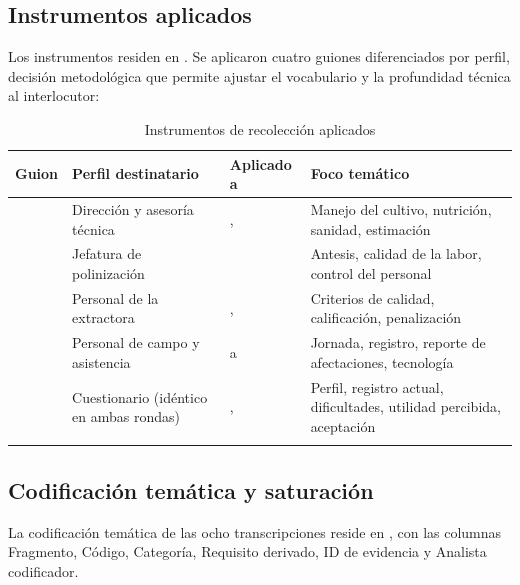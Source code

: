 \subsection{Instrumentos aplicados}

Los instrumentos residen en . Se aplicaron cuatro guiones
diferenciados por perfil, decisión metodológica que permite ajustar el vocabulario y la profundidad
técnica al interlocutor:

\begin{longtable}{|C{2.0cm}|L{5.0cm}|C{2.0cm}|L{5.4cm}|}
\hline
{}\textbf{Guion} & \textbf{Perfil destinatario} & \textbf{Aplicado a} & \textbf{Foco temático} \\
\hline
\endhead
{} & Dirección y asesoría técnica & ,  & Manejo del cultivo, nutrición, sanidad, estimación \\ \hline
{} & Jefatura de polinización &  & Antesis, calidad de la labor, control del personal \\ \hline
{} & Personal de la extractora & ,  & Criterios de calidad, calificación, penalización \\ \hline
{} & Personal de campo y asistencia &  a  & Jornada, registro, reporte de afectaciones, tecnología \\ \hline
{} & Cuestionario (idéntico en ambas rondas) & ,  & Perfil, registro actual, dificultades, utilidad percibida, aceptación \\ \hline
\caption{Instrumentos de recolección aplicados}
\end{longtable}

\subsection{Codificación temática y saturación}

La codificación temática de las ocho transcripciones reside en
\allowbreak{}, con las columnas Fragmento, Código,
Categoría, Requisito derivado, ID de evidencia y Analista codificador.

